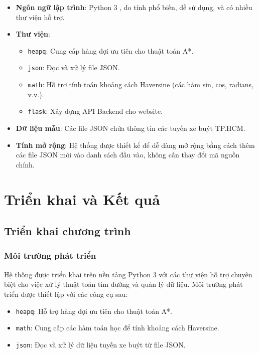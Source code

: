 \documentclass[a4paper,12pt]{article}
\begin{document}
\begin{itemize}
    \item \textbf{Ngôn ngữ lập trình}: Python 3 \cite{python2025}, do tính phổ biến, dễ sử dụng, và có nhiều thư viện hỗ trợ.
    
    \item \textbf{Thư viện}:
    \begin{itemize}
        \item \texttt{heapq}: Cung cấp hàng đợi ưu tiên cho thuật toán A*.
        \item \texttt{json}: Đọc và xử lý file JSON.
        \item \texttt{math}: Hỗ trợ tính toán khoảng cách Haversine (các hàm sin, cos, radians, v.v.).
        \item \texttt{flask}: Xây dựng API Backend cho website.
    \end{itemize}
    
    \item \textbf{Dữ liệu mẫu}: Các file JSON chứa thông tin các tuyến xe buýt TP.HCM.
    
    \item \textbf{Tính mở rộng}: Hệ thống được thiết kế để dễ dàng mở rộng bằng cách thêm các file JSON mới vào danh sách đầu vào, không cần thay đổi mã nguồn chính.
\end{itemize}

\newpage
\section{Triển khai và Kết quả}
\subsection{Triển khai chương trình}
\subsubsection{Môi trường phát triển}

Hệ thống được triển khai trên nền tảng Python 3 với các thư viện hỗ trợ chuyên biệt cho việc xử lý thuật toán tìm đường và quản lý dữ liệu. Môi trường phát triển được thiết lập với các công cụ sau:

\begin{itemize}
    \item \texttt{heapq}: Hỗ trợ hàng đợi ưu tiên cho thuật toán A*.
    \item \texttt{math}: Cung cấp các hàm toán học để tính khoảng cách Haversine.
    \item \texttt{json}: Đọc và xử lý dữ liệu tuyến xe buýt từ file JSON.
\end{itemize}
\end{document}
